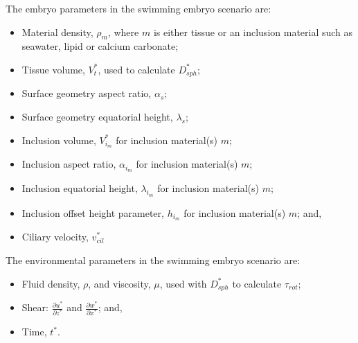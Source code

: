 \documentclass[10pt,a4paper]{article}
\def\p{\partial}
\begin{document}
The embryo parameters in the swimming embryo scenario are:
\begin{itemize}
	\item Material density, $\rho_m$, where $m$ is either tissue or an inclusion material such as seawater, lipid or calcium carbonate;
	\item Tissue volume, $V^*_t$, used to calculate $D_{sph}^*$;
	\item Surface geometry aspect ratio, $\alpha_s$;
	\item Surface geometry equatorial height, $\lambda_s$;
	\item Inclusion volume, $V^*_{i_m}$ for inclusion material(s) $m$;
	\item Inclusion aspect ratio, $\alpha_{i_m}$ for inclusion material(s) $m$;
	\item Inclusion equatorial height, $\lambda_{i_m}$ for inclusion material(s) $m$;
	\item Inclusion offset height parameter, $h_{i_m}$ for inclusion material(s) $m$; and,
	\item Ciliary velocity, $v^*_{cil}$
\end{itemize}
The environmental parameters in the swimming embryo scenario are:
\begin{itemize}
	\item Fluid density, $\rho$, and viscosity, $\mu$, used with $D_{sph}^*$ to calculate $\tau_{rot}$; 
	\item Shear: $\frac{\p u^*}{\p z^*}$ and $\frac{\p w^*}{\p x^*}$; and,
	\item Time, $t^*$.
\end{itemize}
\end{document}
